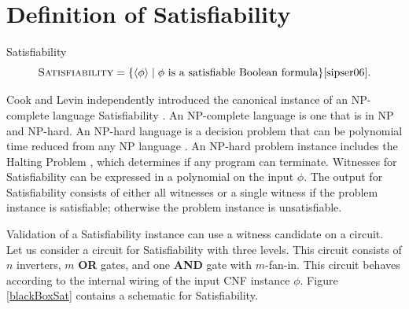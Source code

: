 
	
\section{Definition of {\sc Satisfiability}}

	

\begin{definition}
{\sc Satisfiability}\\
\[
\text{\sc Satisfiability} = \{ \langle \phi \rangle \mid \phi \text{ is a satisfiable Boolean formula}\} \cite{sipser06}.
\]	
\end{definition}

Cook and Levin independently introduced the canonical instance of an \textsf{NP-complete} language {\sc Satisfiability} \cite{Cook:1971:CTP:800157.805047, levin1973}.  An \textsf{NP-complete} language is one that is in \textsf{NP} and \textsf{NP-hard}.  An \textsf{NP-hard} language is a decision problem that can be polynomial time reduced from any \textsf{NP} language \cite{sipser06}.  An \textsf{NP-hard} problem instance includes the {\sc Halting Problem} \cite{sipser06}, which determines if any program can terminate.  Witnesses for {\sc Satisfiability} can be expressed in a polynomial on the input $\phi$.  The output for {\sc Satisfiability} consists of either all witnesses or a single witness if the problem instance is satisfiable; otherwise the problem instance is unsatisfiable. 


Validation of a {\sc Satisfiability} instance can use a witness candidate on a circuit.  Let us consider a circuit for {\sc Satisfiability} with three levels.  This circuit consists of $n$ inverters, $m$ \textbf{OR} gates, and one \textbf{AND} gate with $m$-fan-in.  This circuit behaves according to the internal wiring of the input CNF instance $\phi$. Figure \ref{blackBoxSat} contains a schematic for {\sc Satisfiability}.	

